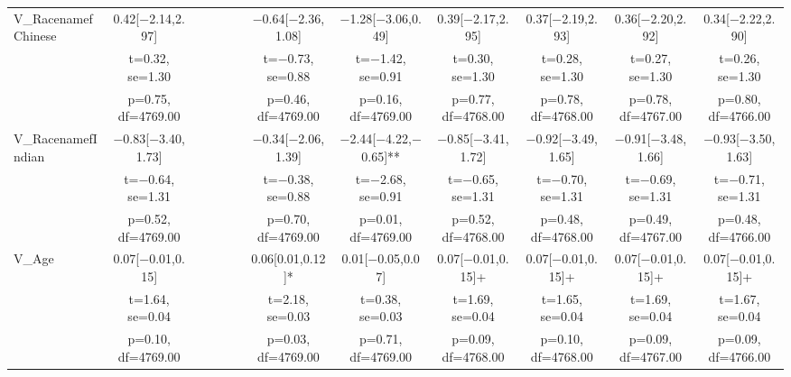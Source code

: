 \documentclass[]{report}
\begin{document}
\begin{table}
{\begin{tabular}[t]{lccccccccccc}
		V\_RacenamefChinese & \num{0.42}[\num{-2.14},\num{2.97}] &  &  &  &  & \num{-0.64}[\num{-2.36},\num{1.08}] & \num{-1.28}[\num{-3.06},\num{0.49}] & \num{0.39}[\num{-2.17},\num{2.95}] & \num{0.37}[\num{-2.19},\num{2.93}] & \num{0.36}[\num{-2.20},\num{2.92}] & \num{0.34}[\num{-2.22},\num{2.90}]\\
		& t=\num{0.32}, se=\num{1.30} &  &  &  &  & t=\num{-0.73}, se=\num{0.88} & t=\num{-1.42}, se=\num{0.91} & t=\num{0.30}, se=\num{1.30} & t=\num{0.28}, se=\num{1.30} & t=\num{0.27}, se=\num{1.30} & t=\num{0.26}, se=\num{1.30}\\
		& p=\num{0.75}, df=\num{4769.00} &  &  &  &  & p=\num{0.46}, df=\num{4769.00} & p=\num{0.16}, df=\num{4769.00} & p=\num{0.77}, df=\num{4768.00} & p=\num{0.78}, df=\num{4768.00} & p=\num{0.78}, df=\num{4767.00} & p=\num{0.80}, df=\num{4766.00}\\
		V\_RacenamefIndian & \num{-0.83}[\num{-3.40},\num{1.73}] &  &  &  &  & \num{-0.34}[\num{-2.06},\num{1.39}] & \num{-2.44}[\num{-4.22},\num{-0.65}]** & \num{-0.85}[\num{-3.41},\num{1.72}] & \num{-0.92}[\num{-3.49},\num{1.65}] & \num{-0.91}[\num{-3.48},\num{1.66}] & \num{-0.93}[\num{-3.50},\num{1.63}]\\
		& t=\num{-0.64}, se=\num{1.31} &  &  &  &  & t=\num{-0.38}, se=\num{0.88} & t=\num{-2.68}, se=\num{0.91} & t=\num{-0.65}, se=\num{1.31} & t=\num{-0.70}, se=\num{1.31} & t=\num{-0.69}, se=\num{1.31} & t=\num{-0.71}, se=\num{1.31}\\
		& p=\num{0.52}, df=\num{4769.00} &  &  &  &  & p=\num{0.70}, df=\num{4769.00} & p=\num{0.01}, df=\num{4769.00} & p=\num{0.52}, df=\num{4768.00} & p=\num{0.48}, df=\num{4768.00} & p=\num{0.49}, df=\num{4767.00} & p=\num{0.48}, df=\num{4766.00}\\
		V\_Age & \num{0.07}[\num{-0.01},\num{0.15}] &  &  &  &  & \num{0.06}[\num{0.01},\num{0.12}]* & \num{0.01}[\num{-0.05},\num{0.07}] & \num{0.07}[\num{-0.01},\num{0.15}]+ & \num{0.07}[\num{-0.01},\num{0.15}]+ & \num{0.07}[\num{-0.01},\num{0.15}]+ & \num{0.07}[\num{-0.01},\num{0.15}]+\\
		& t=\num{1.64}, se=\num{0.04} &  &  &  &  & t=\num{2.18}, se=\num{0.03} & t=\num{0.38}, se=\num{0.03} & t=\num{1.69}, se=\num{0.04} & t=\num{1.65}, se=\num{0.04} & t=\num{1.69}, se=\num{0.04} & t=\num{1.67}, se=\num{0.04}\\
		& p=\num{0.10}, df=\num{4769.00} &  &  &  &  & p=\num{0.03}, df=\num{4769.00} & p=\num{0.71}, df=\num{4769.00} & p=\num{0.09}, df=\num{4768.00} & p=\num{0.10}, df=\num{4768.00} & p=\num{0.09}, df=\num{4767.00} & p=\num{0.09}, df=\num{4766.00}\\

\end{tabular}}
\end{table}
\end{document}
